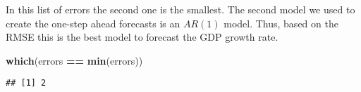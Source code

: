 \documentclass[
]{article}
\newenvironment{Shaded}{\begin{snugshade}}{\end{snugshade}}
\newcommand{\KeywordTok}[1]{\textcolor[rgb]{0.13,0.29,0.53}{\textbf{#1}}}
\newcommand{\NormalTok}[1]{#1}
\newcommand{\OperatorTok}[1]{\textcolor[rgb]{0.81,0.36,0.00}{\textbf{#1}}}
\newcommand{\StringTok}[1]{\textcolor[rgb]{0.31,0.60,0.02}{#1}}
\begin{document}
In this list of errors the second one is the smallest. The second model
we used to create the one-step ahead forecasts is an \(AR(1)\) model.
Thus, based on the RMSE this is the best model to forecast the GDP
growth rate.

\begin{Shaded}
\begin{Highlighting}[]
\KeywordTok{which}\NormalTok{(errors }\OperatorTok{==}\StringTok{ }\KeywordTok{min}\NormalTok{(errors))}
\end{Highlighting}
\end{Shaded}

\begin{verbatim}
## [1] 2
\end{verbatim}
\end{document}
